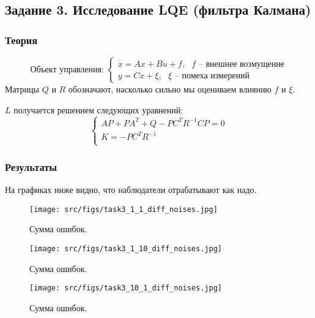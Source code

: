\subsection{Задание 3. Исследование LQE (фильтра Калмана)}

\subsubsection{Теория}
\[      
        \text{Объект управления: }
        \begin{cases}
                \dot{x} = A x + Bu + f, \text{ \(f\) -- внешнее возмущение}\\
                y = Cx + \xi, \text{ \(\xi\) -- помеха измерений}
        \end{cases} 
\]
Матрицы \(Q\) и \(R\) обозначают, насколько сильно мы оцениваем влиянию \(f\) и \(\xi\).

\(L\) получается решением следующих уравнений:
\[
\begin{cases}
    A P + P A^T + Q - PC^TR^{-1}CP = 0\\
    K = -P C^T R^{-1}\\
\end{cases}
\]
\subsubsection{Результаты}

На графиках ниже видно, что наблюдатели отрабатывают как надо.
\begin{figure}[ht!]
  \centering
  \texttt{[image: src/figs/task3\_1\_1\_diff\_noises.jpg]}
  \caption{Сумма ошибок.}
  \label{fig:task3_1}
\end{figure}
\begin{figure}[ht!]
        \centering
        \texttt{[image: src/figs/task3\_1\_10\_diff\_noises.jpg]}
        \caption{Сумма ошибок.}
        \label{fig:task3_2}
\end{figure}
\begin{figure}[ht!]
\centering
\texttt{[image: src/figs/task3\_10\_1\_diff\_noises.jpg]}
\caption{Сумма ошибок.}
\label{fig:task3_3}
\end{figure}

